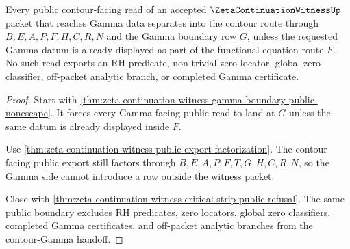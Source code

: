 \begin{theorem}
\label{thm:zeta-continuation-witness-public-contour-gamma-separation}
Every public contour-facing read of an accepted $\ZetaContinuationWitnessUp$ packet that reaches Gamma data separates into the contour route through $B,E,A,P,F,H,C,R,N$ and the Gamma boundary row $G$, unless the requested Gamma datum is already displayed as part of the functional-equation route $F$. No such read exports an RH predicate, non-trivial-zero locator, global zero classifier, off-packet analytic branch, or completed Gamma certificate.
\end{theorem}
\begin{proof}
Start with \autoref{thm:zeta-continuation-witness-gamma-boundary-public-nonescape}. It forces every Gamma-facing public read to land at $G$ unless the same datum is already displayed inside $F$.

Use \autoref{thm:zeta-continuation-witness-public-export-factorization}. The contour-facing public export still factors through $B,E,A,P,F,T,G,H,C,R,N$, so the Gamma side cannot introduce a row outside the witness packet.

Close with \autoref{thm:zeta-continuation-witness-critical-strip-public-refusal}. The same public boundary excludes RH predicates, zero locators, global zero classifiers, completed Gamma certificates, and off-packet analytic branches from the contour-Gamma handoff.
\end{proof}

